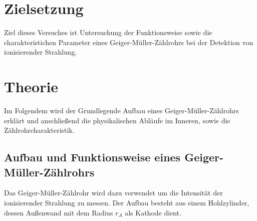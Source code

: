 \section{Zielsetzung}
\label{sec:Zielsetzung}
Ziel dieses Versuches ist Untersuchung der Funktionsweise sowie die charakteristichen
Parameter eines Geiger-Müller-Zählrohrs bei der Detektion von ionisierender Strahlung.
\section{Theorie}
\label{sec:Theorie}
Im Folgendem wird der Grundlegende Aufbau eines Geiger-Müller-Zählrohrs erklärt und 
anschließend die physikalischen Abläufe im Inneren, sowie die Zählrohrcharakteristik.
\subsection{Aufbau und Funktionsweise eines Geiger-Müller-Zählrohrs}
\label{AufuFunk}
Das Geiger-Müller-Zählrohr wird dazu verwendet um die Intensität der ionisierender Strahlung
zu messen. Der Aufbau besteht aus einem Hohlzylinder, dessen Außenwand mit dem Radius $r_A$ als Kathode
dient. 

